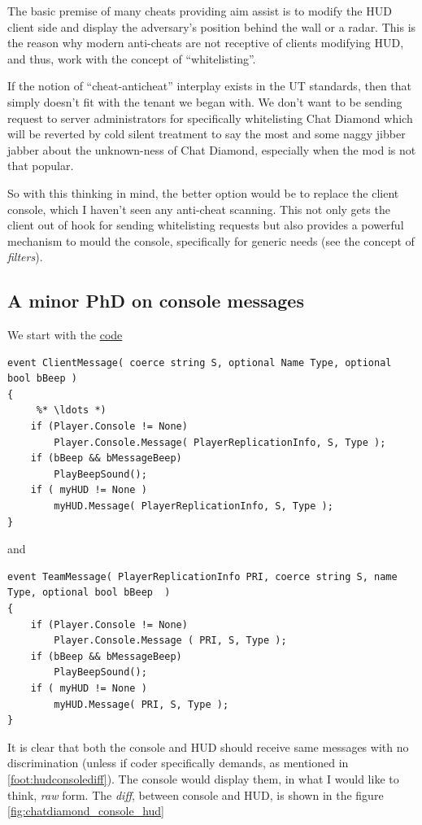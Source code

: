 \documentclass{article}
\theoremstyle{definition}
\begin{document}
The basic premise of many cheats providing aim assist is to modify the HUD client side and display the adversary's position behind the wall or a radar.  This is the reason why modern anti-cheats are not receptive of clients modifying HUD, and thus, work with the concept of ``whitelisting''.

If the notion of ``cheat-anticheat'' interplay exists in the UT standards, then that simply doesn't fit with the tenant we began with.  We don't want to be sending request to server administrators for specifically whitelisting Chat Diamond which will be reverted by cold silent treatment to say the most and some naggy jibber jabber about the unknown-ness of Chat Diamond, especially when the mod is not that popular.

So with this thinking in mind, the better option would be to replace the client console, which I haven't seen any anti-cheat scanning. This not only gets the client out of hook for sending whitelisting requests but also provides a powerful mechanism to mould the console, specifically for generic needs (see the concept of \emph{filters}).

\subsection{A minor PhD on console messages}

We start with the \href{http://uncodex.ut-files.com/UT/v436/Source_engine/playerpawn.html}{code} 

\begin{lstlisting}[frame=single]
event ClientMessage( coerce string S, optional Name Type, optional bool bBeep )
{
     %* \ldots *)    
    if (Player.Console != None)
        Player.Console.Message( PlayerReplicationInfo, S, Type );
    if (bBeep && bMessageBeep)
        PlayBeepSound();
    if ( myHUD != None )
        myHUD.Message( PlayerReplicationInfo, S, Type );
}       
\end{lstlisting}
and
\begin{lstlisting}[frame=single]
event TeamMessage( PlayerReplicationInfo PRI, coerce string S, name Type, optional bool bBeep  )
{
    if (Player.Console != None)
        Player.Console.Message ( PRI, S, Type );
    if (bBeep && bMessageBeep)
        PlayBeepSound();
    if ( myHUD != None )
        myHUD.Message( PRI, S, Type );
}     
\end{lstlisting}

It is clear that both the console and HUD should receive same messages with no discrimination (unless if coder specifically demands, as mentioned in \ref{foot:hudconsolediff}).  The console would display them, in what I would like to think, \emph{raw} form.  The \emph{diff}, between console and HUD, is shown in the figure \ref{fig:chatdiamond_console_hud}
\end{document}
